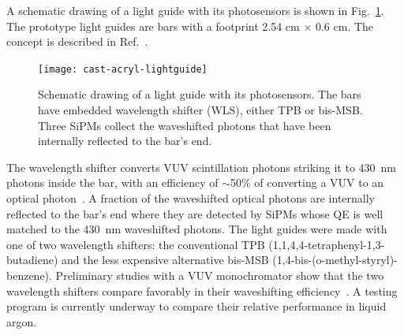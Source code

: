 A schematic drawing of a light guide with its photosensors is shown in
Fig.~\ref{fig:WaveguideSketch}. The prototype light guides are bars
with a footprint 2.54 cm $\times$ 0.6 cm.  The concept is described in
Ref.~\cite{bib:MITbars}.
\begin{figure}[ht]
  \begin{center}
    \texttt{[image: cast-acryl-lightguide]}
    \caption[Schematic drawing of a light guide with its
      photosensors]{Schematic drawing of a light guide with its
      photosensors. The bars have embedded wavelength shifter (WLS),
      either TPB or bis-MSB. Three SiPMs collect the waveshifted
      photons that have been internally reflected to the bar's end.}
    \label{fig:WaveguideSketch}
  \end{center}
\end{figure}
The wavelength shifter converts VUV scintillation photons striking it
to 430~nm photons inside the bar, with an efficiency of $\sim$50\% of
converting a VUV to an optical photon~\cite{bib:gehman}.  A fraction
of the waveshifted optical photons are internally reflected to the
bar's end where they are detected by SiPMs whose QE is well matched to
the 430~nm waveshifted photons. The light guides were made with one of
two wavelength shifters: the conventional TPB
(1,1,4,4-tetraphenyl-1,3-butadiene) and the less expensive alternative
bis-MSB (1,4-bis-(o-methyl-styryl)-benzene). Preliminary studies with
a VUV monochromator show that the two wavelength shifters compare
favorably in their waveshifting efficiency~\cite{bib:baptistaJINST}. A
testing program is currently underway to compare their relative
performance in liquid argon.


